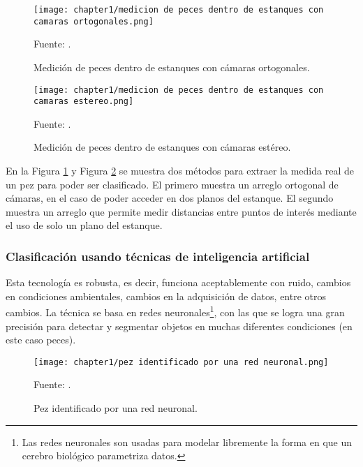\begin{figure}[H]
	\centering
	\texttt{[image: chapter1/medicion de peces dentro de estanques con camaras ortogonales.png]}
	\caption{Medición de  peces dentro de estanques con cámaras ortogonales.}
	Fuente: \cite{Al-Jubouri2017}.
	\label{fig:medicion de peces dentro de estanques con camaras ortogonales}
\end{figure}

\begin{figure}[H]
	\centering
	\texttt{[image: chapter1/medicion de peces dentro de estanques con camaras estereo.png]}
	\caption{Medición de  peces dentro de estanques con cámaras estéreo.}
	Fuente: \cite{Al-Jubouri2017}.
	\label{fig:medicion de peces dentro de estanques con camaras estereo}
\end{figure}

En la Figura \ref{fig:medicion de peces dentro de estanques con camaras ortogonales} y Figura \ref{fig:medicion de peces dentro de estanques con camaras estereo} se muestra dos métodos para extraer la medida real de un pez para poder ser clasificado. El primero muestra un arreglo ortogonal de cámaras, en el caso de poder acceder en dos planos del estanque. El segundo muestra un arreglo que permite medir distancias entre puntos de interés mediante el uso de solo un plano del estanque.

\subsubsection{Clasificación usando técnicas de inteligencia artificial}

Esta tecnología es robusta, es decir, funciona aceptablemente con ruido, cambios en condiciones ambientales, cambios en la adquisición de datos, entre otros cambios. La técnica se basa en redes neuronales\footnote{Las redes neuronales son usadas para modelar libremente la forma en que un cerebro biológico parametriza datos.}, con las que se logra una gran precisión para detectar y segmentar objetos en muchas diferentes condiciones (en este caso peces).\\

\begin{figure}[H]
	\centering
	\texttt{[image: chapter1/pez identificado por una red neuronal.png]}
	\caption{Pez identificado por una red neuronal.}
	Fuente: \cite{Varalakshmi2019}.
	\label{fig:pez identificado por una red neuronal}
\end{figure}

